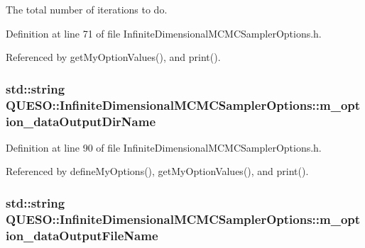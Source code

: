 The total number of iterations to do. 



Definition at line 71 of file Infinite\-Dimensional\-M\-C\-M\-C\-Sampler\-Options.\-h.



Referenced by get\-My\-Option\-Values(), and print().

\hypertarget{class_q_u_e_s_o_1_1_infinite_dimensional_m_c_m_c_sampler_options_a75dac93b87f4e93ffef95b35c7382ad2}{
\subsubsection[{m\-\_\-option\-\_\-data\-Output\-Dir\-Name}]{\setlength{\rightskip}{0pt plus 5cm}std\-::string Q\-U\-E\-S\-O\-::\-Infinite\-Dimensional\-M\-C\-M\-C\-Sampler\-Options\-::m\-\_\-option\-\_\-data\-Output\-Dir\-Name\hspace{0.3cm}{\ttfamily [private]}}}\label{class_q_u_e_s_o_1_1_infinite_dimensional_m_c_m_c_sampler_options_a75dac93b87f4e93ffef95b35c7382ad2}


Definition at line 90 of file Infinite\-Dimensional\-M\-C\-M\-C\-Sampler\-Options.\-h.



Referenced by define\-My\-Options(), get\-My\-Option\-Values(), and print().

\hypertarget{class_q_u_e_s_o_1_1_infinite_dimensional_m_c_m_c_sampler_options_a4c405def589baa661b5e76f0ca0ef280}{
\subsubsection[{m\-\_\-option\-\_\-data\-Output\-File\-Name}]{\setlength{\rightskip}{0pt plus 5cm}std\-::string Q\-U\-E\-S\-O\-::\-Infinite\-Dimensional\-M\-C\-M\-C\-Sampler\-Options\-::m\-\_\-option\-\_\-data\-Output\-File\-Name\hspace{0.3cm}{\ttfamily [private]}}}\label{class_q_u_e_s_o_1_1_infinite_dimensional_m_c_m_c_sampler_options_a4c405def589baa661b5e76f0ca0ef280}


